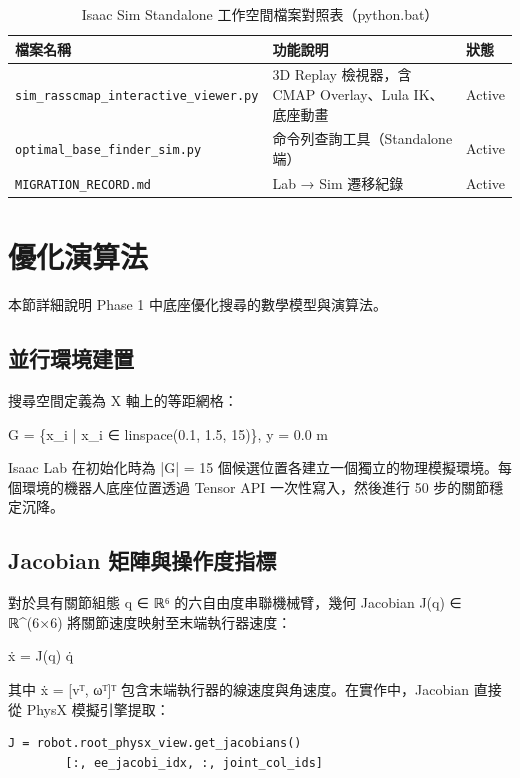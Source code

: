 \documentclass[a4paper, 12pt]{article}
\begin{document}
\begin{table}[H]
\centering
\caption{Isaac Sim Standalone 工作空間檔案對照表（python.bat）}
\label{tab:files_sim}
\small
\begin{tabularx}{\textwidth}{l X l}
\toprule
\textbf{檔案名稱} & \textbf{功能說明} & \textbf{狀態} \\
\midrule
\texttt{sim\_rasscmap\_interactive\_viewer.py} & 3D Replay 檢視器，含 CMAP Overlay、Lula IK、底座動畫 & Active \\
\texttt{optimal\_base\_finder\_sim.py} & 命令列查詢工具（Standalone 端） & Active \\
\texttt{MIGRATION\_RECORD.md} & Lab → Sim 遷移紀錄 & Active \\
\bottomrule
\end{tabularx}
\end{table}

\section{優化演算法}
\label{sec:algorithm}

本節詳細說明 Phase 1 中底座優化搜尋的數學模型與演算法。

\subsection{並行環境建置}
\label{subsec:parallel_env}

搜尋空間定義為 X 軸上的等距網格：
\begin{center}
G = \{x\_i | x\_i ∈ linspace(0.1, 1.5, 15)\}, y = 0.0 m
\end{center}
Isaac Lab 在初始化時為 |G| = 15 個候選位置各建立一個獨立的物理模擬環境。每個環境的機器人底座位置透過 Tensor API 一次性寫入，然後進行 50 步的關節穩定沉降。

\subsection{Jacobian 矩陣與操作度指標}
\label{subsec:jacobian}

對於具有關節組態 q ∈ ℝ⁶ 的六自由度串聯機械臂，幾何 Jacobian J(q) ∈ ℝ\^{}(6×6) 將關節速度映射至末端執行器速度：
\begin{center}
ẋ = J(q) q̇
\end{center}
其中 ẋ = [vᵀ, ωᵀ]ᵀ 包含末端執行器的線速度與角速度。在實作中，Jacobian 直接從 PhysX 模擬引擎提取：
\begin{lstlisting}[caption={從 PhysX 提取 Jacobian 矩陣}]
J = robot.root_physx_view.get_jacobians()
        [:, ee_jacobi_idx, :, joint_col_ids]
\end{lstlisting}
\end{document}
